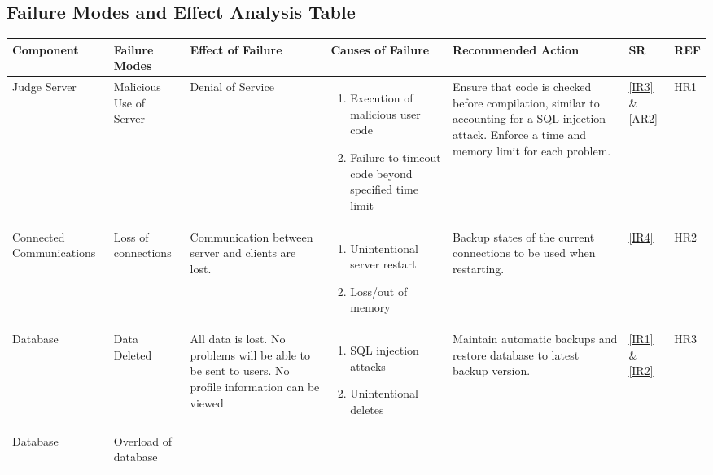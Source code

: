\documentclass{article}
\begin{document}
\begin{landscape}
\subsection{Failure Modes and Effect Analysis Table}
\begin{table}[H]
    \begin{tabularx}{1.46\textwidth}{|p{2.3cm}|p{2.3cm}|p{3.5cm}|p{4.4cm}|p{4.5cm}|p{1cm}|p{1cm}|}
        \hline
        Component & Failure Modes & Effect of Failure & Causes of Failure & Recommended Action & SR & REF \\
        \hline
        Judge Server & 
        Malicious Use of Server & 
        Denial of Service & 
        \begin{enumerate}
            \item Execution of malicious user code
            \item Failure to timeout code beyond specified time limit
        \end{enumerate} &
        Ensure that code is checked before compilation, similar to accounting for a SQL injection attack. Enforce a time and memory limit for each problem. &
        \ref{IR3} \& \ref{AR2} &
        HR1\\
        \hline
        Connected Communications & 
        Loss of connections	 & 
        Communication between server and clients are lost. & 
        \begin{enumerate}
            \item Unintentional server restart
            \item Loss/out of memory
        \end{enumerate} &
        Backup states of the current connections to be used when restarting. &
        \ref{IR4}&
        HR2 \\
        \hline
        Database & 
        Data Deleted & 
        All data is lost. No problems will be able to be sent to users. No profile information can be viewed & 
        \begin{enumerate}
            \item SQL injection attacks
            \item Unintentional deletes
        \end{enumerate} &
        Maintain automatic backups and restore database to latest backup version. &
        \ref{IR1} \& \ref{IR2} &
        HR3 \\
        \hline
        Database & 
        Overload of database & 

\end{tabularx}
\end{table}
\end{landscape}
\end{document}
